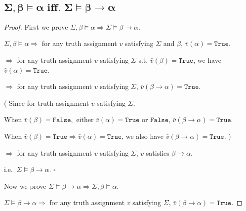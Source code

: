 \documentclass{article}
\newcommand{\whiteqed}{\hfill $\square$\par}
\begin{document}
\subsection{$\boldsymbol{\Sigma,\beta\vDash\alpha\text{ iff. }\Sigma\vDash\beta\to\alpha}$}
\vspace{1em}
\begin{proof}
    First we prove $\Sigma,\beta\vDash\alpha\Longrightarrow\Sigma\vDash\beta\to\alpha$.

    \hspace{1.3em}
    $\Sigma,\beta\vDash\alpha\Longrightarrow$ for any truth assignment $v$ satisfying $\Sigma$ and $\beta$, $\bar{v}(\alpha)=\mathtt{True}$.

    \hspace{5.1em}
    $\Longrightarrow$ for any truth assignment $v$ satisfying $\Sigma$ s.t. $\bar{v}(\beta)=\mathtt{True}$, we have $\bar{v}(\alpha)=\mathtt{True}$.

    \hspace{5.1em}
    $\Longrightarrow$ for any truth assignment $v$ satisfying $\Sigma$, $\bar{v}(\beta\to\alpha)=\mathtt{True}$.

    \hspace{7em}
    ( Since for truth assignment $v$ satisfying $\Sigma$,

    \hspace{7.6em}
    When $\bar{v}(\beta)=\mathtt{False},$ either $\bar{v}(\alpha)=\mathtt{True}$ or $\mathtt{False}$, $\bar{v}(\beta\to\alpha)=\mathtt{True}$.

    \hspace{7.6em}
    When $\bar{v}(\beta)=\mathtt{True}\Longrightarrow\bar{v}(\alpha)=\mathtt{True}$, we also have $\bar{v}(\beta\to\alpha)=\mathtt{True}$. )

    \hspace{5.1em}
    $\Longrightarrow$ for any truth assignment $v$ satisfying $\Sigma$, $v$ satisfies $\beta\to\alpha$.

    \hspace{5.1em}
    i.e. $\ \Sigma\vDash\beta\to\alpha$. \whiteqed

    \vspace{1em} \hspace{1.3em}
    Now we prove $\Sigma\vDash\beta\to\alpha\Longrightarrow\Sigma,\beta\vDash\alpha$.

    \hspace{1.3em}
    $\Sigma\vDash\beta\to\alpha\Longrightarrow$ for any truth assignment $v$ satisfying $\Sigma$, $\bar{v}(\beta\to\alpha)=\mathtt{True}$.


\end{proof}
\end{document}
